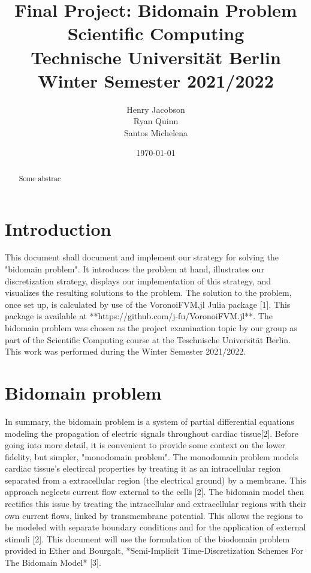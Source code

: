 \documentclass{finalproject}
\title{Final Project: Bidomain Problem \\ \large{Scientific Computing \\ Technische Universität Berlin \\ Winter Semester 2021/2022}}
\author{Henry Jacobson\\Ryan Quinn\\Santos Michelena}
\date{\today}
\begin{document}
\maketitle

\begin{abstract} %
Some abstrac
\end{abstract}

\section{Introduction} %



This document shall document and implement our strategy for solving the "bidomain problem". It introduces the problem at hand, illustrates our discretization strategy, displays our implementation of this strategy, and visualizes the resulting solutions to the problem.
The solution to the problem, once set up, is calculated by use of the VoronoiFVM.jl Julia package [1]. This package is available at **https://github.com/j-fu/VoronoiFVM.jl**.
The bidomain problem was chosen as the project examination topic by our group as part of the Scientific Computing course at the Teschnische Universität Berlin. This work was performed during the Winter Semester 2021/2022.
\section{Bidomain problem}
In summary, the bidomain problem is a system of partial differential equations modeling the propagation of electric signals throughout cardiac tissue[2]. Before going into more detail, it is convenient to provide some context on the lower fidelity, but simpler, "monodomain problem". 
The monodomain problem models cardiac tissue's electircal properties by treating it as an intracellular region separated from a extracellular region (the electrical ground) by a membrane. This approach neglects current flow external to the cells [2].
The bidomain model then rectifies this issue by treating the intracellular and extracellular regions with their own current flows, linked by transmembrane potential. This allows the regions to be modeled with separate boundary conditions and for the application of external stimuli [2].
This document will use the formulation of the biodomain problem provided in Ether and Bourgalt, *Semi-Implicit Time-Discretization Schemes For The Bidomain Model* [3].
\end{document}
